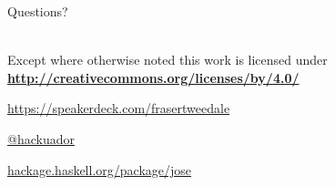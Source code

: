 \documentclass[ignorenonframetext,aspectratio=43]{beamer}
\begin{document}
\begin{frame}[plain]

    \begin{center}
        \Huge Questions?
        \bigskip
    \end{center}

    \hypersetup{urlcolor=black}

    \setlength{\parskip}{.5em}

    {\centering
    \\
    { \scriptsize
    Except where otherwise noted this work is licensed under
    }\\
    { \footnotesize
      \textbf{\url{http://creativecommons.org/licenses/by/4.0/}}
    }

    \bigskip
    \large \tt

    \url{https://speakerdeck.com/frasertweedale}

    \href{https://twitter.com/hackuador}{@hackuador}

    \href{https://hackage.haskell.org/package/jose}{hackage.haskell.org/package/jose}

    }

\end{frame}
\end{document}
